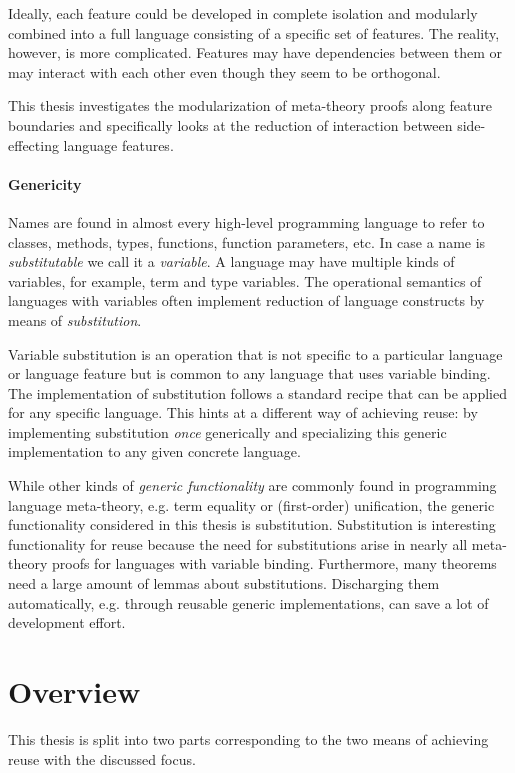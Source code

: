 {Ideally, each feature could be developed in complete isolation and modularly
combined into a full language consisting of a specific set of features. The
reality, however, is more complicated. Features may have dependencies between
them or may interact with each other even though they seem to be orthogonal.

This thesis investigates the modularization of meta-theory proofs along feature
boundaries and specifically looks at the reduction of interaction between
side-effecting language features.


\paragraph{Genericity}
Names are found in almost every high-level programming language to refer to
classes, methods, types, functions, function parameters, etc. In case a name is
\emph{substitutable} we call it a \emph{variable}. A language may have multiple
kinds of variables, for example, term and type variables. The operational
semantics of languages with variables often implement reduction of language
constructs by means of \emph{substitution}.

Variable substitution is an operation that is not specific to a particular
language or language feature but is common to any language that uses variable
binding. The implementation of substitution follows a standard recipe that can
be applied for any specific language. This hints at a different way of achieving
reuse: by implementing substitution \emph{once} generically and specializing
this generic implementation to any given concrete language.

While other kinds of \emph{generic functionality} are commonly found in
programming language meta-theory, e.g. term equality or (first-order)
unification, the generic functionality considered in this thesis is
substitution. Substitution is interesting functionality for reuse because the
need for substitutions arise in nearly all meta-theory proofs for languages with
variable binding. Furthermore, many theorems need a large amount of lemmas about
substitutions. Discharging them automatically, e.g. through reusable generic
implementations, can save a lot of development effort.

\section{Overview}

This thesis is split into two parts corresponding to the two means of achieving
reuse with the discussed focus.

}
